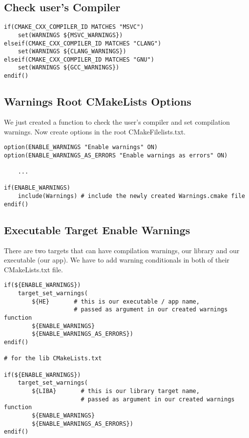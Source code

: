\subsection{Check user's Compiler}

\begin{verbatim}
if(CMAKE_CXX_COMPILER_ID MATCHES "MSVC")
    set(WARNINGS ${MSVC_WARNINGS})
elseif(CMAKE_CXX_COMPILER_ID MATCHES "CLANG")
    set(WARNINGS ${CLANG_WARNINGS})
elseif(CMAKE_CXX_COMPILER_ID MATCHES "GNU")
    set(WARNINGS ${GCC_WARNINGS})
endif()
\end{verbatim}


\subsection{Warnings Root CMakeLists Options}

We just created a function to check the user's compiler and set compilation warnings.
Now create options in the root CMakeFilelists.txt.

\begin{verbatim}
option(ENABLE_WARNINGS "Enable warnings" ON)
option(ENABLE_WARNINGS_AS_ERRORS "Enable warnings as errors" ON)

    ...

if(ENABLE_WARNINGS)
    include(Warnings) # include the newly created Warnings.cmake file
endif()
\end{verbatim}


\subsection{Executable Target Enable Warnings}

There are two targets that can have compilation warnings, our library and our executable (our app). We have to 
add warning conditionals in both of their CMakeLists.txt file.

\begin{verbatim}
if(${ENABLE_WARNINGS})
    target_set_warnings(
        ${HE}       # this is our executable / app name,
                    # passed as argument in our created warnings function
        ${ENABLE_WARNINGS}
        ${ENABLE_WARNINGS_AS_ERRORS})
endif()

# for the lib CMakeLists.txt

if(${ENABLE_WARNINGS})
    target_set_warnings(
        ${LIBA}       # this is our library target name,
                      # passed as argument in our created warnings function
        ${ENABLE_WARNINGS}
        ${ENABLE_WARNINGS_AS_ERRORS})
endif()
\end{verbatim}

